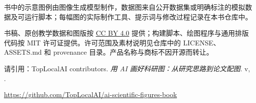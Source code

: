 \documentclass[UTF8,openany,fontset=fandol,zihao=-4]{ctexbook}
\begin{document}
书中的示意图例由图像生成模型制作，数据图来自公开数据集或明确标注的模拟数据及可运行脚本；每幅图的实际制作工具、提示词与修改过程记录在本书仓库中。

书稿、原创教学数据和图版按 \href{https://creativecommons.org/licenses/by/4.0/}{CC BY 4.0} 提供；构建脚本、绘图程序与通用排版代码按 MIT 许可证提供。许可范围及素材说明见仓库中的 LICENSE、ASSETS.md 和 provenance 目录。产品名称与商标不因开源而转让。

请引用：TopLocalAI contributors. \emph{用 AI 画好科研图：从研究思路到论文配图}. v\bookversion, \bookdate.

\url{https://github.com/TopLocalAI/ai-scientific-figures-book}
\begingroup\small\linespread{1.0}\selectfont
\setlength{\parskip}{0pt}
\tableofcontents
\endgroup

\mainmatter













\appendix

\backmatter

\end{document}
